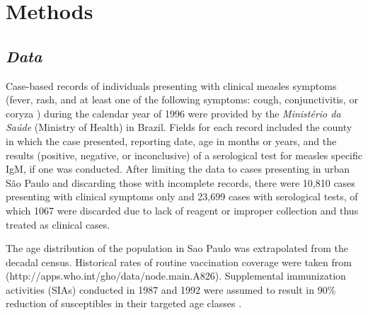 \section{\texorpdfstring{\textbf{Methods}}{Methods}}\label{methods}

\subsection{\texorpdfstring{\emph{Data}}{Data}}\label{data}

Case-based records of individuals presenting with clinical measles symptoms (fever, rash, and at least one of the following symptoms: cough, conjunctivitis, or coryza \cite{Hutchins_2004}) during the calendar year of 1996 were provided by the \textit{Ministério da Saúde} (Ministry of Health) in Brazil. Fields for each record included the county in which the case presented, reporting date, age in months or years, and the results (positive, negative, or inconclusive) of a serological test for measles specific IgM, if one was conducted. After limiting the data to cases presenting in urban S\~{a}o Paulo and discarding those with incomplete records, there were 10,810 cases presenting with clinical symptoms only
and 23,699 cases with serological tests, of which 1067 were discarded due to lack of reagent or improper collection and thus treated as clinical cases.

The age distribution of the population in Sao Paulo was extrapolated from the decadal census. Historical rates of routine vaccination coverage were taken from (http://apps.who.int/gho/data/node.main.A826). Supplemental immunization activities (SIAs) conducted in 1987 and 1992 were assumed to result in 90\% reduction of susceptibles in their targeted age classes \cite{1959156}.